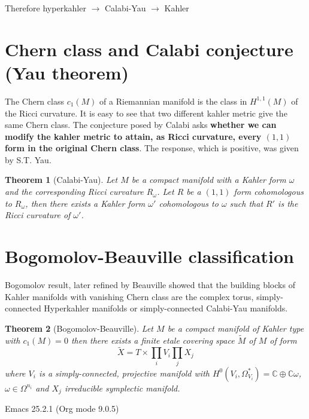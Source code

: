 \documentclass[11pt]{article}
\newtheorem{theorem}{Theorem}
\begin{document}
Therefore hyperkahler \(\longrightarrow\) Calabi-Yau \(\longrightarrow\) Kahler

\section{Chern class and Calabi conjecture (Yau theorem)}
\label{sec:org53e8201}
The Chern class \(c_1(M)\) of a Riemannian manifold is the class in \(H^{1,1}(M)\) of the Ricci
curvature. It is easy to see that two different kahler metric give the same Chern class. The
conjecture posed by Calabi asks \textbf{whether we can modify the kahler metric to attain, as Ricci
curvature, every \((1,1)\) form in the original Chern class}. The response, which is positive, was
given by S.T. Yau.

\begin{theorem}[Calabi-Yau]
\label{org0014987}
Let \(M\) be a compact manifold with a Kahler form \(\omega\) and the corresponding Ricci curvature
\(R_\omega\). Let \(R\) be a \((1,1)\) form cohomologous to \(R_\omega\), then there exists a Kahler form
\(\omega'\) cohomologous to \(\omega\) such that \(R'\) is the Ricci curvature of \(\omega'\).
\end{theorem}



\section{Bogomolov-Beauville classification}
\label{sec:org4be41d5}

Bogomolov result, later refined by Beauville showed that the building blocks of Kahler manifolds
with vanishing Chern class are the complex torus, simply-connected Hyperkahler manifolds or
simply-connected Calabi-Yau manifolds.

\begin{theorem}[Bogomolov-Beauville]
\label{orgdda46fb}
Let \(M\) be a compact manifold of Kahler type with \(c_1(M)=0\) then there exists a finite etale
covering space \(\tilde M\) of \(M\) of form
\[
\tilde X = T\times \prod_i V_i \prod_j X_j
\]
where \(V_i\) is a simply-connected, projective manifold with \(H^0(V_i,\Omega_{V_i}^*) = \mathbb{C}
\oplus \mathbb{C}\omega\), \(\omega\in \Omega^{n_i}\) and \(X_j\) irreducible symplectic manifold.
\end{theorem}
Emacs 25.2.1 (Org mode 9.0.5)
\end{document}
